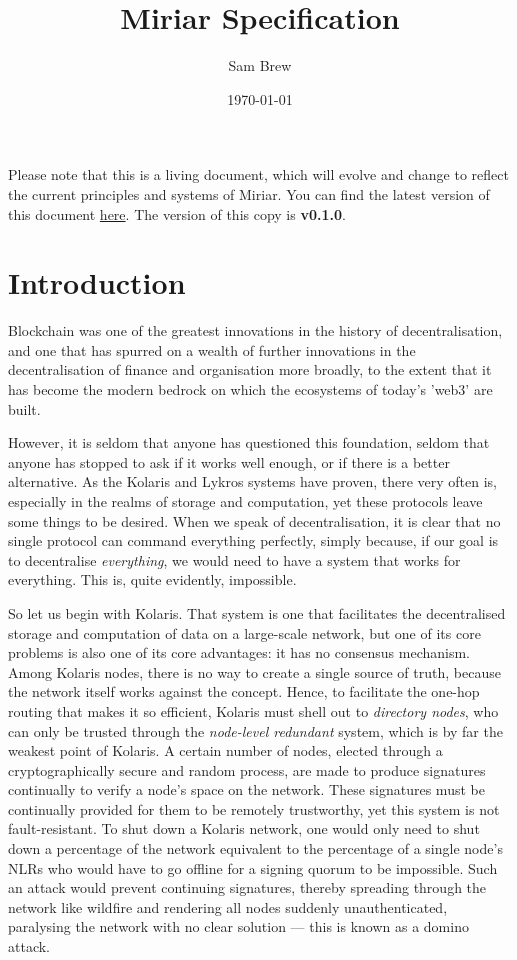 \documentclass{extreport}
\author{Sam Brew}
\date{\today}
\title{Miriar Specification}
\begin{document}
\maketitle
\tableofcontents
\vspace*{\fill}
\noindent Please note that this is a living document, which will evolve and change to reflect the current principles and systems of Miriar. You can find the latest version of this document \href{https://github.com/TheQuantorium/miriar/releases}{here}. The version of this copy is \textbf{v0.1.0}.
\doclicenseThis


\part{Introduction}
\label{sec:org14ec0e7}

Blockchain was one of the greatest innovations in the history of decentralisation, and one that has spurred on a wealth of further innovations in the decentralisation of finance and organisation more broadly, to the extent that it has become the modern bedrock on which the ecosystems of today's 'web3' are built.

However, it is seldom that anyone has questioned this foundation, seldom that anyone has stopped to ask if it works well enough, or if there is a better alternative. As the Kolaris and Lykros systems have proven, there very often is, especially in the realms of storage and computation, yet these protocols leave some things to be desired. When we speak of decentralisation, it is clear that no single protocol can command everything perfectly, simply because, if our goal is to decentralise \emph{everything}, we would need to have a system that works for everything. This is, quite evidently, impossible.

So let us begin with Kolaris. That system is one that facilitates the decentralised storage and computation of data on a large-scale network, but one of its core problems is also one of its core advantages: it has no consensus mechanism. Among Kolaris nodes, there is no way to create a single source of truth, because the network itself works against the concept. Hence, to facilitate the one-hop routing that makes it so efficient, Kolaris must shell out to \emph{directory nodes}, who can only be trusted through the \emph{node-level redundant} system, which is by far the weakest point of Kolaris. A certain number of nodes, elected through a cryptographically secure and random process, are made to produce signatures continually to verify a node's space on the network. These signatures must be continually provided for them to be remotely trustworthy, yet this system is not fault-resistant. To shut down a Kolaris network, one would only need to shut down a percentage of the network equivalent to the percentage of a single node's NLRs who would have to go offline for a signing quorum to be impossible. Such an attack would prevent continuing signatures, thereby spreading through the network like wildfire and rendering all nodes suddenly unauthenticated, paralysing the network with no clear solution --- this is known as a domino attack.
\end{document}
